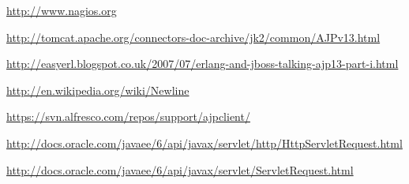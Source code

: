 \documentclass[12pt,a4]{article}
\begin{document}
\begin{thebibliography}{9}

\url{http://www.nagios.org}

\url{http://tomcat.apache.org/connectors-doc-archive/jk2/common/AJPv13.html}

\url{http://easyerl.blogspot.co.uk/2007/07/erlang-and-jboss-talking-ajp13-part-i.html}

\url{http://en.wikipedia.org/wiki/Newline}


\url{https://svn.alfresco.com/repos/support/ajpclient/}

\url{http://docs.oracle.com/javaee/6/api/javax/servlet/http/HttpServletRequest.html}

\url{http://docs.oracle.com/javaee/6/api/javax/servlet/ServletRequest.html}

\end{thebibliography}
\end{document}
